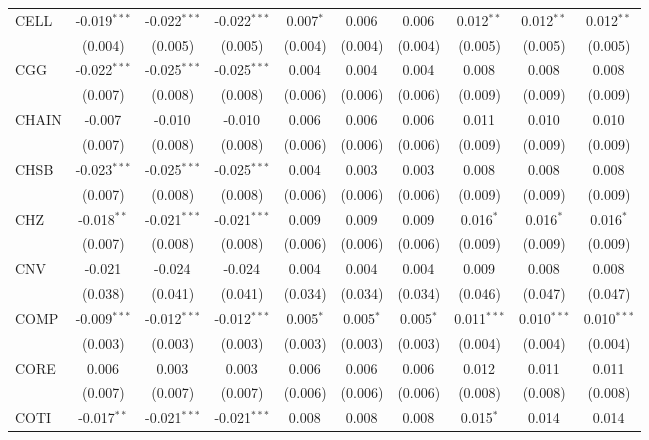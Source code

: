 \begin{table}[!htbp]
\begin{tabular}{@{\extracolsep{5pt}}lccccccccc}
 CELL & -0.019$^{***}$ & -0.022$^{***}$ & -0.022$^{***}$ & 0.007$^{*}$ & 0.006$^{}$ & 0.006$^{}$ & 0.012$^{**}$ & 0.012$^{**}$ & 0.012$^{**}$ \\
  & (0.004) & (0.005) & (0.005) & (0.004) & (0.004) & (0.004) & (0.005) & (0.005) & (0.005) \\
 CGG & -0.022$^{***}$ & -0.025$^{***}$ & -0.025$^{***}$ & 0.004$^{}$ & 0.004$^{}$ & 0.004$^{}$ & 0.008$^{}$ & 0.008$^{}$ & 0.008$^{}$ \\
  & (0.007) & (0.008) & (0.008) & (0.006) & (0.006) & (0.006) & (0.009) & (0.009) & (0.009) \\
 CHAIN & -0.007$^{}$ & -0.010$^{}$ & -0.010$^{}$ & 0.006$^{}$ & 0.006$^{}$ & 0.006$^{}$ & 0.011$^{}$ & 0.010$^{}$ & 0.010$^{}$ \\
  & (0.007) & (0.008) & (0.008) & (0.006) & (0.006) & (0.006) & (0.009) & (0.009) & (0.009) \\
 CHSB & -0.023$^{***}$ & -0.025$^{***}$ & -0.025$^{***}$ & 0.004$^{}$ & 0.003$^{}$ & 0.003$^{}$ & 0.008$^{}$ & 0.008$^{}$ & 0.008$^{}$ \\
  & (0.007) & (0.008) & (0.008) & (0.006) & (0.006) & (0.006) & (0.009) & (0.009) & (0.009) \\
 CHZ & -0.018$^{**}$ & -0.021$^{***}$ & -0.021$^{***}$ & 0.009$^{}$ & 0.009$^{}$ & 0.009$^{}$ & 0.016$^{*}$ & 0.016$^{*}$ & 0.016$^{*}$ \\
  & (0.007) & (0.008) & (0.008) & (0.006) & (0.006) & (0.006) & (0.009) & (0.009) & (0.009) \\
 CNV & -0.021$^{}$ & -0.024$^{}$ & -0.024$^{}$ & 0.004$^{}$ & 0.004$^{}$ & 0.004$^{}$ & 0.009$^{}$ & 0.008$^{}$ & 0.008$^{}$ \\
  & (0.038) & (0.041) & (0.041) & (0.034) & (0.034) & (0.034) & (0.046) & (0.047) & (0.047) \\
 COMP & -0.009$^{***}$ & -0.012$^{***}$ & -0.012$^{***}$ & 0.005$^{*}$ & 0.005$^{*}$ & 0.005$^{*}$ & 0.011$^{***}$ & 0.010$^{***}$ & 0.010$^{***}$ \\
  & (0.003) & (0.003) & (0.003) & (0.003) & (0.003) & (0.003) & (0.004) & (0.004) & (0.004) \\
 CORE & 0.006$^{}$ & 0.003$^{}$ & 0.003$^{}$ & 0.006$^{}$ & 0.006$^{}$ & 0.006$^{}$ & 0.012$^{}$ & 0.011$^{}$ & 0.011$^{}$ \\
  & (0.007) & (0.007) & (0.007) & (0.006) & (0.006) & (0.006) & (0.008) & (0.008) & (0.008) \\
 COTI & -0.017$^{**}$ & -0.021$^{***}$ & -0.021$^{***}$ & 0.008$^{}$ & 0.008$^{}$ & 0.008$^{}$ & 0.015$^{*}$ & 0.014$^{}$ & 0.014$^{}$ \\

\end{tabular}
\end{table}
